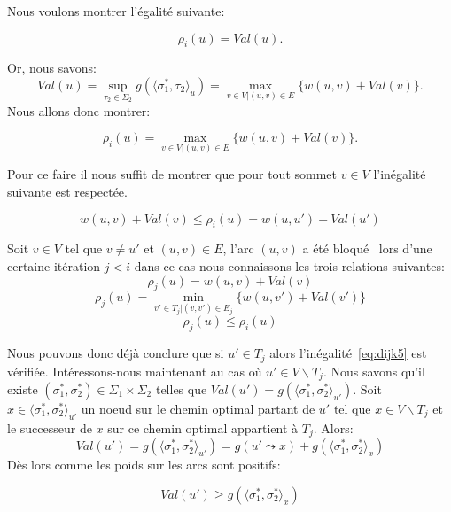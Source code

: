 \begin{enumerate}
 Nous voulons montrer l'égalité suivante:

$$ \rho_i(u) = Val(u) .$$

Or, nous savons: 
$$ Val(u) = \sup _{\tau_2 \in \Sigma_2 } g( \langle \sigma^*_1, \tau_2 \rangle_u) = \max_{v \in V | (u,v) \in E} \{ w(u,v) + Val(v) \} .$$
Nous allons donc montrer:

\begin{equation*}
	\rho_i(u) = \max_{v \in V | (u,v) \in E} \{ w(u,v) + Val(v) \}.
\end{equation*}

Pour ce faire il nous suffit de montrer que pour tout sommet $v \in V$ l'inégalité suivante est respectée.

\begin{equation}
	\label{eq:dijk5}
	w(u,v) + Val(v) \leq \rho_i(u) = w(u,u') + Val(u') 
\end{equation}

Soit $v \in V$ tel que $v \neq u'$ et $(u,v) \in E$, l'arc $(u,v)$ a été \og bloqué \fg~lors d'une certaine itération $j < i $ dans ce cas nous connaissons les trois relations suivantes:
\begin{equation} \label{eq:dijk6}
	  \rho_j(u) = w(u,v) + Val(v) 
	\end{equation}
\begin{equation*}  \rho_j(u) = \min_{v' \in T_j |(v,v') \in E_j} \{ w(u,v') + Val(v') \} \end{equation*}
\begin{equation*} \rho_j(u) \leq \rho_i(u) \end{equation*}
	
Nous pouvons donc déjà conclure que si $u' \in T_j$ alors l'inégalité~\eqref{eq:dijk5} est vérifiée.
Intéressons-nous maintenant au cas où $u' \in V \backslash T_j$. Nous savons qu'il existe $(\sigma_1^*, \sigma_2^*)\! \in \Sigma_1 \times \Sigma_2$ telles que $Val(u') = g( \langle \sigma_1^*, \sigma_2^* \rangle_{u'})$. 
Soit $x \in \langle \sigma_1^*, \sigma_2^* \rangle_{u'}$ un noeud sur le chemin optimal partant de $u'$ tel que $x \in V\backslash T_j$ et le successeur de $x$ sur ce chemin optimal appartient à $T_j$.
Alors:
$$ Val(u') = g( \langle \sigma_1^*, \sigma_2^* \rangle_{u'}) = g(u' \leadsto x) + g( \langle \sigma_1^*, \sigma_2^* \rangle_{x}) $$
Dès lors comme les poids sur les arcs sont positifs:

\begin{equation*}
	Val(u') \geq g( \langle \sigma_1^*, \sigma_2^* \rangle_{x})
\end{equation*}


\end{enumerate}
